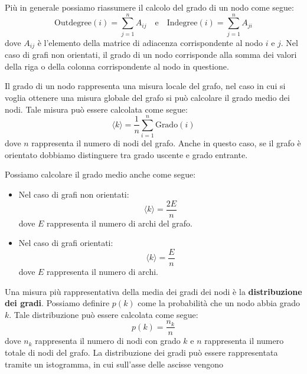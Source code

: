 Più in generale possiamo riassumere il calcolo del grado di un nodo come segue:
\begin{equation}
    \text{Outdegree}(i) = \sum_{j=1}^{n} A_{ij} \quad \text{e} \quad
    \text{Indegree}(i) = \sum_{j=1}^{n} A_{ji}
\end{equation}
dove $A_{ij}$ è l'elemento della matrice di adiacenza corrispondente al nodo
$i$ e $j$. Nel caso di grafi non orientati, il grado di un nodo corrisponde
alla somma dei valori della riga o della colonna corrispondente al nodo in
questione.

Il grado di un nodo rappresenta una misura locale del grafo, nel caso in cui
si voglia ottenere una misura globale del grafo si può calcolare il grado
medio dei nodi. Tale misura può essere calcolata come segue:
\begin{equation}
    \langle k \rangle = \frac{1}{n} \sum_{i=1}^{n} \text{Grado}(i)
\end{equation}
dove $n$ rappresenta il numero di nodi del grafo. Anche in questo caso, se il
grafo è orientato dobbiamo distinguere tra grado uscente e grado entrante.
\begin{nota}
    Possiamo calcolare il grado medio anche come segue:
    \begin{itemize}
        \item Nel caso di grafi non orientati:
              \begin{equation}
                  \langle k \rangle = \frac{2E}{n}
              \end{equation}
              dove $E$ rappresenta il numero di archi del grafo.
        \item Nel caso di grafi orientati:
              \begin{equation}
                  \langle k \rangle = \frac{E}{n}
              \end{equation}
              dove $E$ rappresenta il numero di archi.
    \end{itemize}
\end{nota}
Una misura più rappresentativa della media dei gradi dei nodi è la \textbf{distribuzione
    dei gradi}. Possiamo definire $p(k)$ come la probabilità che un nodo abbia
grado $k$. Tale distribuzione può essere calcolata come segue:
\begin{equation}
    p(k) = \frac{n_k}{n}
\end{equation}
dove $n_k$ rappresenta il numero di nodi con grado $k$ e $n$ rappresenta il
numero totale di nodi del grafo. La distribuzione dei gradi può essere
rappresentata tramite un istogramma, in cui sull'asse delle ascisse vengono
